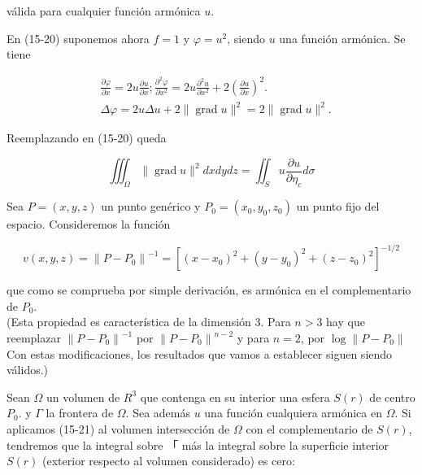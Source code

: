 \documentclass[10pt]{article}
\theoremstyle{plain}
\theoremstyle{definition}
\theoremstyle{remark}
\begin{document}
válida para cualquier función armónica $u$.

En (15-20) suponemos ahora $f=1$ y $\varphi=u^{2}$, siendo $u$ una función armónica. Se tiene

$$
\begin{aligned}
& \frac{\partial \varphi}{\partial x}=2 u \frac{\partial u}{\partial x} ; \frac{\partial^{2} \varphi}{\partial x^{2}}=2 u \frac{\partial^{2} u}{\partial x^{2}}+2\left(\frac{\partial u}{\partial x}\right)^{2} . \\
& \Delta \varphi=2 u \Delta u+2\|\operatorname{grad} u\|^{2}=2\|\operatorname{grad} u\|^{2} .
\end{aligned}
$$

Reemplazando en (15-20) queda


\begin{equation*}
\iiint_{\Omega}\|\operatorname{grad} u\|^{2} d x d y d z=\iint_{S} u \frac{\partial u}{\partial \eta_{c}} d \sigma \tag{15-23}
\end{equation*}


Sea $P=(x, y, z)$ un punto genérico y $P_{0}=\left(x_{0}, y_{0}, z_{0}\right)$ un punto fijo del espacio. Consideremos la función

$$
v(x, y, z)=\left\|P-P_{0}\right\|^{-1}=\left[\left(x-x_{0}\right)^{2}+\left(y-y_{0}\right)^{2}+\left(z-z_{0}\right)^{2}\right]^{-1 / 2}
$$

que como se comprueba por simple derivación, es armónica en el complementario de $P_{0}$.\\
(Esta propiedad es característica de la dimensión 3. Para $n>3$ hay que reemplazar $\left\|P-P_{0}\right\|^{-1}$ por $\left\|P-P_{0}\right\|^{n-2}$ y para $n=2$, por $\log \left\|P-P_{0}\right\|$ Con estas modificaciones, los resultados que vamos a establecer siguen siendo válidos.)

Sean $\Omega$ un volumen de $R^{3}$ que contenga en su interior una esfera $S(r)$ de centro $P_{0}$. y $\Gamma$ la frontera de $\Omega$. Sea además $u$ una función cualquiera armónica en $\Omega$. Si aplicamos (15-21) al volumen intersección de $\Omega$ con el complementario de $S(r)$, tendremos que la integral sobre 「 más la integral sobre la superficie interior $S(r)$ (exterior respecto al volumen considerado) es cero:
\end{document}
